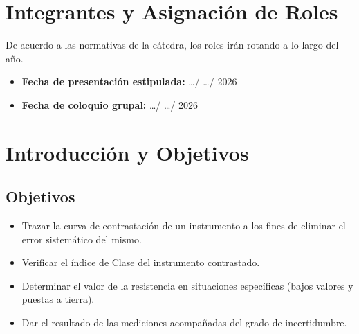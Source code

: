 \documentclass{informeutn}
\begin{document}
\maketitle

\chapter{Integrantes y Asignación de Roles}
De acuerdo a las normativas de la cátedra, los roles irán rotando a lo largo del año.
\begin{table}[H]
    \centering
    \caption{Tabla de asignación de roles del grupo.}
\end{table}

\begin{itemize}
    \item \textbf{Fecha de presentación estipulada:} \dots / \dots / 2026
    \item \textbf{Fecha de coloquio grupal:} \dots / \dots / 2026
\end{itemize}

\chapter{Introducción y Objetivos}

\section{Objetivos}
\begin{itemize}
    \item Trazar la curva de contrastación de un instrumento a los fines de eliminar el error sistemático del mismo.
    \item Verificar el índice de Clase del instrumento contrastado.
    \item Determinar el valor de la resistencia en situaciones específicas (bajos valores y puestas a tierra).
    \item Dar el resultado de las mediciones acompañadas del grado de incertidumbre.
\end{itemize}
\end{document}
